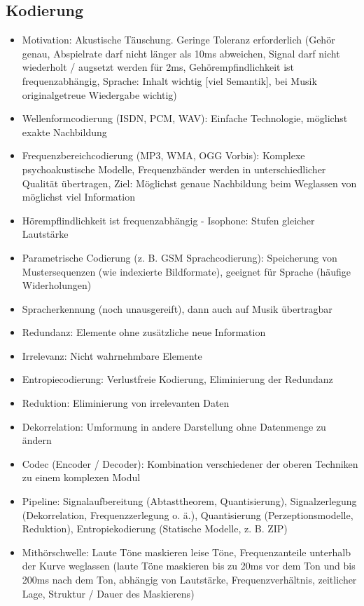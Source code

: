 \documentclass[12pt,landscape]{article}
\begin{document}
\begin{multicols}{3}
\subsection{Kodierung}
\begin{itemize}
\item Motivation: Akustische Täuschung. Geringe Toleranz erforderlich (Gehör genau, Abspielrate darf nicht länger als 10ms abweichen, Signal darf nicht wiederholt / augsetzt werden für 2ms, Gehörempfindlichkeit ist frequenzabhängig, Sprache: Inhalt wichtig [viel Semantik], bei Musik originalgetreue Wiedergabe wichtig)
\item Wellenformcodierung (ISDN, PCM, WAV): Einfache Technologie, möglichst exakte Nachbildung
\item Frequenzbereichcodierung (MP3, WMA, OGG Vorbis): Komplexe psychoakustische Modelle, Frequenzbänder werden in unterschiedlicher Qualität übertragen, Ziel: Möglichst genaue Nachbildung beim Weglassen von möglichst viel Information
\item Hörempflindlichkeit ist frequenzabhängig - Isophone: Stufen gleicher Lautstärke
\item Parametrische Codierung (z. B. GSM Sprachcodierung): Speicherung von Mustersequenzen (wie indexierte Bildformate), geeignet für Sprache (häufige Widerholungen)
\item Spracherkennung (noch unausgereift), dann auch auf Musik übertragbar
\item Redundanz: Elemente ohne zusätzliche neue Information
\item Irrelevanz: Nicht wahrnehmbare Elemente
\item Entropiecodierung: Verlustfreie Kodierung, Eliminierung der Redundanz
\item Reduktion: Eliminierung von irrelevanten Daten
\item Dekorrelation: Umformung in andere Darstellung ohne Datenmenge zu ändern
\item Codec (Encoder / Decoder): Kombination verschiedener der oberen Techniken zu einem komplexen Modul
\item Pipeline: Signalaufbereitung (Abtasttheorem, Quantisierung), Signalzerlegung (Dekorrelation, Frequenzzerlegung o. ä.), Quantisierung (Perzeptionsmodelle, Reduktion), Entropiekodierung (Statische Modelle, z. B. ZIP)
\item Mithörschwelle: Laute Töne maskieren leise Töne, Frequenzanteile unterhalb der Kurve weglassen (laute Töne maskieren bis zu 20ms vor dem Ton und bis 200ms nach dem Ton, abhängig von Lautstärke, Frequenzverhältnis, zeitlicher Lage, Struktur / Dauer des Maskierens)

\end{itemize}
\end{multicols}
\end{document}
